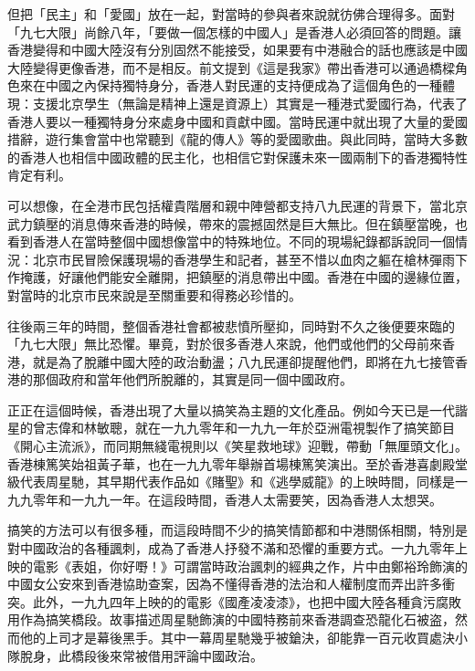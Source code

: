 但把「民主」和「愛國」放在一起，對當時的參與者來說就彷佛合理得多。面對「九七大限」尚餘八年，「要做一個怎樣的中國人」是香港人必須回答的問題。讓香港變得和中國大陸沒有分別固然不能接受，如果要有中港融合的話也應該是中國大陸變得更像香港，而不是相反。前文提到《這是我家》帶出香港可以通過橋樑角色來在中國之內保持獨特身分，香港人對民運的支持便成為了這個角色的一種體現：支援北京學生（無論是精神上還是資源上）其實是一種港式愛國行為，代表了香港人要以一種獨特身分來處身中國和貢獻中國。當時民運中就出現了大量的愛國措辭，遊行集會當中也常聽到《龍的傳人》等的愛國歌曲。與此同時，當時大多數的香港人也相信中國政體的民主化，也相信它對保護未來一國兩制下的香港獨特性肯定有利。

可以想像，在全港市民包括權貴階層和親中陣營都支持八九民運的背景下，當北京武力鎮壓的消息傳來香港的時候，帶來的震撼固然是巨大無比。但在鎮壓當晚，也看到香港人在當時整個中國想像當中的特殊地位。不同的現場紀錄都訴說同一個情況：北京市民冒險保護現場的香港學生和記者，甚至不惜以血肉之軀在槍林彈雨下作掩護，好讓他們能安全離開，把鎮壓的消息帶出中國。香港在中國的邊緣位置，對當時的北京市民來說是至關重要和得務必珍惜的。


往後兩三年的時間，整個香港社會都被悲憤所壓抑，同時對不久之後便要來臨的「九七大限」無比恐懼。畢竟，對於很多香港人來說，他們或他們的父母前來香港，就是為了脫離中國大陸的政治動盪；八九民運卻提醒他們，即將在九七接管香港的那個政府和當年他們所脫離的，其實是同一個中國政府。

正正在這個時候，香港出現了大量以搞笑為主題的文化產品。例如今天已是一代諧星的曾志偉和林敏聰，就在一九九零年和一九九一年於亞洲電視製作了搞笑節目《開心主流派》，而同期無綫電視則以《笑星救地球》迎戰，帶動「無厘頭文化」。香港棟篤笑始祖黃子華，也在一九九零年舉辦首場棟篤笑演出。至於香港喜劇殿堂級代表周星馳，其早期代表作品如《賭聖》和《逃學威龍》的上映時間，同樣是一九九零年和一九九一年。在這段時間，香港人太需要笑，因為香港人太想哭。

搞笑的方法可以有很多種，而這段時間不少的搞笑情節都和中港關係相關，特別是對中國政治的各種諷刺，成為了香港人抒發不滿和恐懼的重要方式。一九九零年上映的電影《表姐，你好嘢！》可謂當時政治諷刺的經典之作，片中由鄭裕玲飾演的中國女公安來到香港協助查案，因為不懂得香港的法治和人權制度而弄出許多衝突。此外，一九九四年上映的的電影《國產凌凌漆》，也把中國大陸各種貪污腐敗用作為搞笑橋段。故事描述周星馳飾演的中國特務前來香港調查恐龍化石被盗，然而他的上司才是幕後黑手。其中一幕周星馳幾乎被鎗決，卻能靠一百元收買處決小隊脫身，此橋段後來常被借用評論中國政治。

